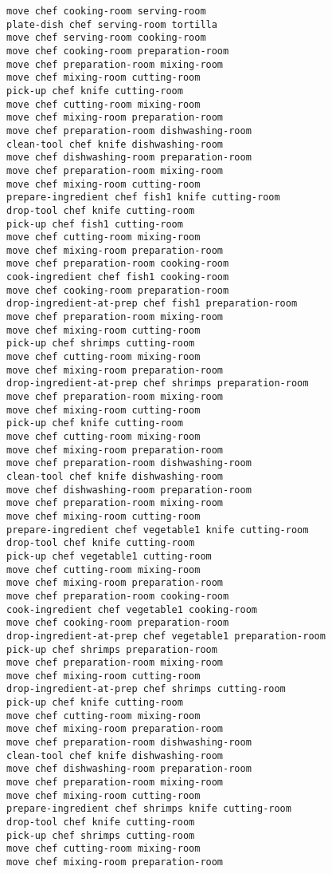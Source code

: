 \documentclass[a4paper,12pt]{article}
\begin{document}
\begin{lstlisting}[language=PDDL, caption=Plan for Problem 3]
move chef cooking-room serving-room 
plate-dish chef serving-room tortilla 
move chef serving-room cooking-room 
move chef cooking-room preparation-room 
move chef preparation-room mixing-room 
move chef mixing-room cutting-room 
pick-up chef knife cutting-room 
move chef cutting-room mixing-room 
move chef mixing-room preparation-room 
move chef preparation-room dishwashing-room 
clean-tool chef knife dishwashing-room 
move chef dishwashing-room preparation-room 
move chef preparation-room mixing-room 
move chef mixing-room cutting-room 
prepare-ingredient chef fish1 knife cutting-room 
drop-tool chef knife cutting-room 
pick-up chef fish1 cutting-room 
move chef cutting-room mixing-room 
move chef mixing-room preparation-room 
move chef preparation-room cooking-room 
cook-ingredient chef fish1 cooking-room 
move chef cooking-room preparation-room 
drop-ingredient-at-prep chef fish1 preparation-room 
move chef preparation-room mixing-room 
move chef mixing-room cutting-room 
pick-up chef shrimps cutting-room 
move chef cutting-room mixing-room 
move chef mixing-room preparation-room 
drop-ingredient-at-prep chef shrimps preparation-room 
move chef preparation-room mixing-room 
move chef mixing-room cutting-room 
pick-up chef knife cutting-room 
move chef cutting-room mixing-room 
move chef mixing-room preparation-room 
move chef preparation-room dishwashing-room 
clean-tool chef knife dishwashing-room 
move chef dishwashing-room preparation-room 
move chef preparation-room mixing-room 
move chef mixing-room cutting-room 
prepare-ingredient chef vegetable1 knife cutting-room 
drop-tool chef knife cutting-room 
pick-up chef vegetable1 cutting-room 
move chef cutting-room mixing-room 
move chef mixing-room preparation-room 
move chef preparation-room cooking-room 
cook-ingredient chef vegetable1 cooking-room 
move chef cooking-room preparation-room 
drop-ingredient-at-prep chef vegetable1 preparation-room 
pick-up chef shrimps preparation-room 
move chef preparation-room mixing-room 
move chef mixing-room cutting-room 
drop-ingredient-at-prep chef shrimps cutting-room 
pick-up chef knife cutting-room 
move chef cutting-room mixing-room 
move chef mixing-room preparation-room 
move chef preparation-room dishwashing-room 
clean-tool chef knife dishwashing-room 
move chef dishwashing-room preparation-room 
move chef preparation-room mixing-room 
move chef mixing-room cutting-room 
prepare-ingredient chef shrimps knife cutting-room 
drop-tool chef knife cutting-room 
pick-up chef shrimps cutting-room 
move chef cutting-room mixing-room 
move chef mixing-room preparation-room 

\end{lstlisting}
\end{document}
